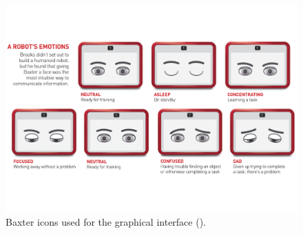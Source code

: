 \begin{figure}[htp]
	\centering
	\includegraphics[width=0.8\linewidth]{figures/baxter-icons.pdf}
	\caption{Baxter icons used for the graphical interface (\cite{baxteremojis}).}
	\label{fig:baxter-icons}
\end{figure}




\newpage
